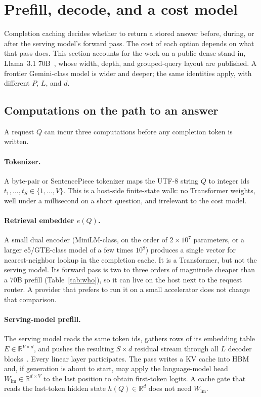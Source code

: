 \section{Prefill, decode, and a cost model}
\label{sec:cost}

Completion caching decides whether to return a stored answer before, during, or after the serving model's forward pass. The cost of each option depends on what that pass does. This section accounts for the work on a public dense stand-in, Llama~3.1 70B~\citep{grattafiori2024llama}, whose width, depth, and grouped-query layout are published. A frontier Gemini-class model is wider and deeper; the same identities apply, with different $P$, $L$, and $d$.

\subsection{Computations on the path to an answer}
\label{sec:cost-three}

A request $Q$ can incur three computations before any completion token is written.

\paragraph{Tokenizer.}
A byte-pair or SentencePiece tokenizer maps the UTF-8 string $Q$ to integer ids $t_1,\ldots,t_S\in\{1,\ldots,V\}$. This is a host-side finite-state walk: no Transformer weights, well under a millisecond on a short question, and irrelevant to the cost model.

\paragraph{Retrieval embedder $e(Q)$.}
A small dual encoder (MiniLM-class, on the order of $2\times 10^7$ parameters, or a larger e5/GTE-class model of a few times $10^8$) produces a single vector for nearest-neighbor lookup in the completion cache. It is a Transformer, but not the serving model. Its forward pass is two to three orders of magnitude cheaper than a 70B prefill (Table~\ref{tab:who}), so it can live on the host next to the request router. A provider that prefers to run it on a small accelerator does not change that comparison.

\paragraph{Serving-model prefill.}
The serving model reads the same token ids, gathers rows of its embedding table $E\in\mathbb{R}^{V\times d}$, and pushes the resulting $S\times d$ residual stream through all $L$ decoder blocks~\citep{pope2023efficiently}. Every linear layer participates. The pass writes a KV cache into HBM and, if generation is about to start, may apply the language-model head $W_{\mathrm{lm}}\in\mathbb{R}^{d\times V}$ to the last position to obtain first-token logits. A cache gate that reads the last-token hidden state $h(Q)\in\mathbb{R}^{d}$ does not need $W_{\mathrm{lm}}$.

